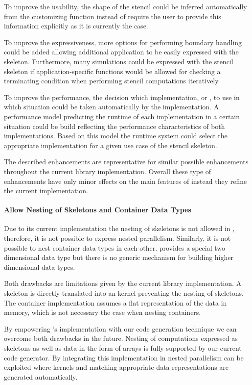 To improve the usability, the shape of the stencil could be inferred automatically from the customizing function instead of require the user to provide this information explicitly as it is currently the case.

To improve the expressiveness, more options for performing boundary handling could be added allowing additional application to be easily expressed with the skeleton.
Furthermore, many simulations could be expressed with the stencil skeleton if application-specific functions would be allowed for checking a terminating condition when performing stencil computations iteratively.

To improve the performance, the decision which implementation,  or , to use in which situation could be taken automatically by the \SkelCL implementation.
A performance model predicting the runtime of each implementation in a certain situation could be build reflecting the performance characteristics of both implementations.
Based on this model the runtime system could select the appropriate implementation for a given use case of the stencil skeleton.

\bigskip
The described enhancements are representative for similar possible enhancements throughout the current \SkelCL library implementation.
Overall these type of enhancements have only minor effects on the main features of \SkelCL instead they refine the current \SkelCL implementation.

\paragraph{Allow Nesting of Skeletons and Container Data Types}
Due to its current implementation the nesting of skeletons is not allowed in \SkelCL, therefore, it is not possible to express nested parallelism.
Similarly, it is not possible to nest container data types in each other.
\SkelCL provides a special two dimensional data type but there is no generic mechanism for building higher dimensional data types.

Both drawbacks are limitations given by the current library implementation.
A skeleton is directly translated into an \OpenCL kernel preventing the nesting of skeletons.
The container implementation assumes a flat representation of the data in memory, which is not necessary the case when nesting containers.

By empowering \SkelCL's implementation with our code generation technique we can overcome both drawbacks in the future.
Nesting of computations expressed as skeletons as well as data in the form of arrays is fully supported by our current code generator.
By integrating this implementation in \SkelCL nested parallelism can be exploited where \OpenCL kernels and matching appropriate data representations are generated automatically.

